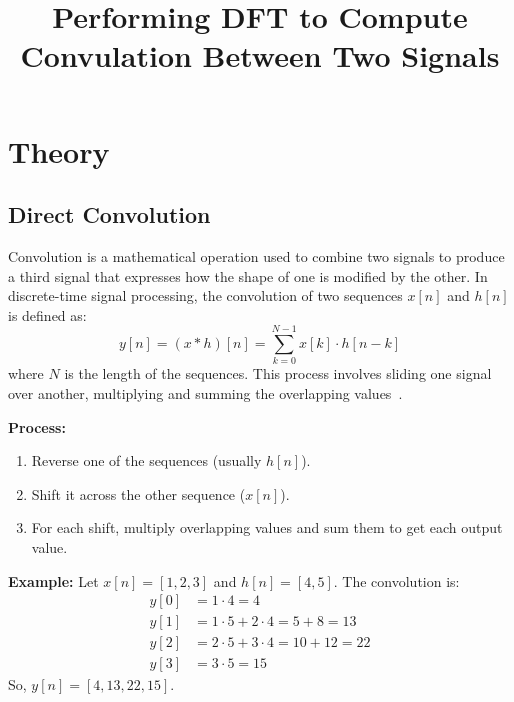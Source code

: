 \documentclass[11pt]{article}
\title{Performing DFT to Compute Convulation Between Two Signals}
\author{}
\date{}
\begin{document}


\pagebreak

\tableofcontents

\pagebreak
{}
\maketitle

\section*{Theory}

\subsection*{Direct Convolution}
Convolution is a mathematical operation used to combine two signals to produce a third signal that expresses how the shape of one is modified by the other. In discrete-time signal processing, the convolution of two sequences $x[n]$ and $h[n]$ is defined as:
\begin{equation}
    y[n] = (x * h)[n] = \sum_{k=0}^{N-1} x[k] \cdot h[n-k]
\end{equation}
where $N$ is the length of the sequences. This process involves sliding one signal over another, multiplying and summing the overlapping values~\cite{oppenheim1999discrete}.

\textbf{Process:}
\begin{enumerate}
    \item Reverse one of the sequences (usually $h[n]$).
    \item Shift it across the other sequence ($x[n]$).
    \item For each shift, multiply overlapping values and sum them to get each output value.
\end{enumerate}

\textbf{Example:}
Let $x[n] = [1, 2, 3]$ and $h[n] = [4, 5]$. The convolution is:
\begin{align*}
    y[0] & = 1 \cdot 4 = 4                        \\
    y[1] & = 1 \cdot 5 + 2 \cdot 4 = 5 + 8 = 13   \\
    y[2] & = 2 \cdot 5 + 3 \cdot 4 = 10 + 12 = 22 \\
    y[3] & = 3 \cdot 5 = 15
\end{align*}
So, $y[n] = [4, 13, 22, 15]$.
\end{document}

